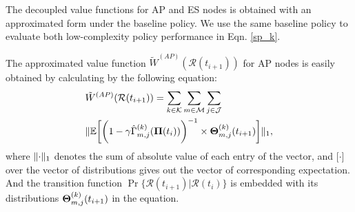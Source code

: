 The decoupled value functions for AP and ES nodes is obtained with an approximated form under the baseline policy. We use the same baseline policy to evaluate both low-complexity policy performance in Eqn. \ref{sp_k}.
        
The approximated value function $\tilde{W}^{(AP)}(\mathcal{R}(t_{i+1}))$ for AP nodes is easily obtained by calculating by the following equation:
\begin{align}
    &\tilde{W}^{(AP)}(\mathcal{R}(t_{i+1})) = \sum_{k\in\mathcal{K}}\sum_{m\in\mathcal{M}}\sum_{j\in\mathcal{J}}
    \nonumber\\
    & \lVert
        \mathbb{E}\bigg[
            \bigg(
                1 - \gamma \hat{\Gamma}^{(k)}_{m,j}(\boldsymbol{\Pi}(t_{i}))
            \bigg)^{-1} \times \boldsymbol{\Theta}^{(k)}_{m,j}(t_{i+1})
        \bigg]
    \|_1,
\end{align}
where $\lVert\cdot\|_1$ denotes the sum of absolute value of each entry of the vector, and $\mathbb[\cdot]$ over the vector of distributions gives out the vector of corresponding expectation. And the transition function $\Pr\{ \mathcal{R}(t_{i+1})|\mathcal{R}(t_{i}) \}$ is embedded with its distributions $\boldsymbol{\Theta}^{(k)}_{m,j}(t_{i+1})$ in the equation.


